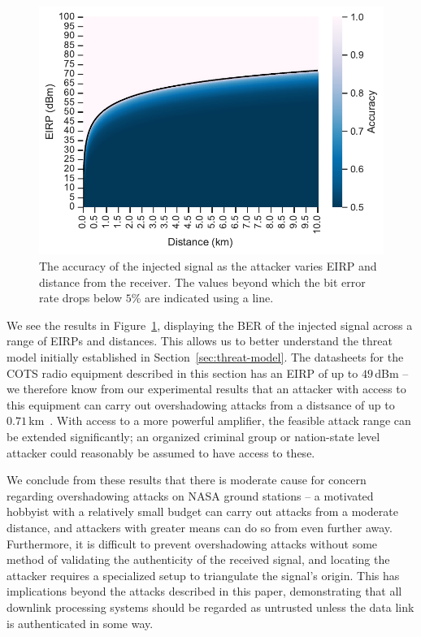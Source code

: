 \begin{figure}
    \centering
    \includegraphics[width=\columnwidth]{diagrams/distance_eirp_heatmap_95.pdf}
    \caption{The accuracy of the injected signal as the attacker varies EIRP and distance from the receiver. The values beyond which the bit error rate drops below $5$\% are indicated using a line.}
    \label{fig:distance_eirp}
\end{figure}

We see the results in Figure~\ref{fig:distance_eirp}, displaying the BER of the injected signal across a range of EIRPs and distances.
This allows us to better understand the threat model initially established in Section~\ref{sec:threat-model}.
The datasheets for the COTS radio equipment described in this section has an EIRP of up to $49$\,dBm -- we therefore know from our experimental results that an attacker with access to this equipment can carry out overshadowing attacks from a distsance of up to $0.71$\,km~\cite{endurosat:xbandtransmitter,endurosat:xbandantenna}.
With access to a more powerful amplifier, the feasible attack range can be extended significantly; an organized criminal group or nation-state level attacker could reasonably be assumed to have access to these.

We conclude from these results that there is moderate cause for concern regarding overshadowing attacks on NASA ground stations -- a motivated hobbyist with a relatively small budget can carry out attacks from a moderate distance, and attackers with greater means can do so from even further away.
Furthermore, it is difficult to prevent overshadowing attacks without some method of validating the authenticity of the received signal, and locating the attacker requires a specialized setup to triangulate the signal's origin.
This has implications beyond the attacks described in this paper, demonstrating that all downlink processing systems should be regarded as untrusted unless the data link is authenticated in some way.
